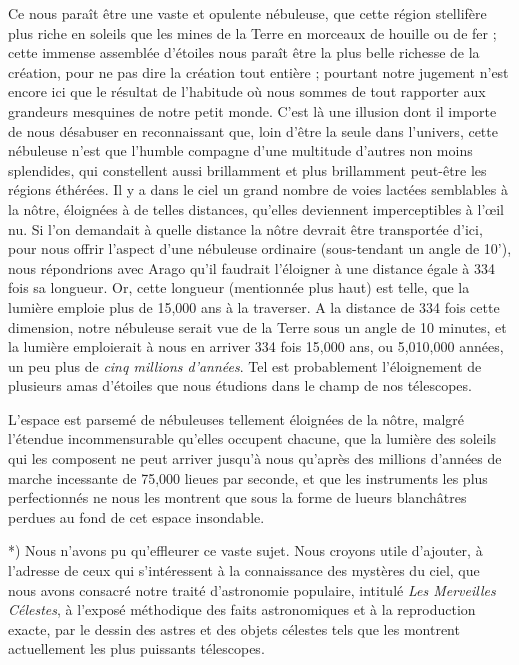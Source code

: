 \documentclass[a4paper, 11pt, oneside]{article}
\begin{document}
Ce nous paraît être une vaste et opulente nébuleuse, que cette région stellifère plus riche en soleils que les mines de la Terre en morceaux de houille ou de fer ; cette immense assemblée d'étoiles nous paraît être la plus belle richesse de la création, pour ne pas dire la création tout entière ; pourtant notre jugement n'est encore ici que le résultat de l'habitude où nous sommes de tout rapporter aux grandeurs mesquines de notre petit monde. C'est là une illusion dont il importe de nous désabuser en reconnaissant que, loin d'être la seule dans l'univers, cette nébuleuse n'est que l'humble compagne d'une multitude d'autres non moins splendides, qui constellent aussi brillamment et plus brillamment peut-être les régions éthérées. Il y a dans le ciel un grand nombre de voies lactées semblables à la nôtre, éloignées à de telles distances, qu'elles deviennent imperceptibles à l'œil nu. Si l'on demandait à quelle distance la nôtre devrait être transportée d'ici, pour nous offrir l'aspect d'une nébuleuse ordinaire (sous-tendant un angle de 10'), nous répondrions avec Arago qu'il faudrait l'éloigner à une distance égale à 334 fois sa longueur. Or, cette longueur (mentionnée plus haut) est telle, que la lumière emploie plus de 15,000 ans à la traverser. A la distance de 334 fois cette dimension, notre nébuleuse serait vue de la Terre sous un angle de 10 minutes, et la lumière emploierait à nous en arriver 334 fois 15,000 ans, ou 5,010,000 années, un peu plus de \emph{cinq millions d'années}. Tel est probablement l'éloignement de plusieurs amas d'étoiles que nous étudions dans le champ de nos télescopes.

L'espace est parsemé de nébuleuses tellement éloignées de la nôtre, malgré l'étendue incommensurable qu'elles occupent chacune, que la lumière des soleils qui les composent ne peut arriver jusqu'à nous qu'après des millions d'années de marche incessante de 75,000 lieues par seconde, et que les instruments les plus perfectionnés ne nous les montrent que sous la forme de lueurs blanchâtres perdues au fond de cet espace insondable.

*) Nous n'avons pu qu'effleurer ce vaste sujet. Nous croyons utile d'ajouter, à l'adresse de ceux qui s'intéressent à la connaissance des mystères du ciel, que nous avons consacré notre traité d'astronomie populaire, intitulé \emph{Les Merveilles Célestes}, à l'exposé méthodique des faits astronomiques et à la reproduction exacte, par le dessin des astres et des objets célestes tels que les montrent actuellement les plus puissants télescopes.
\end{document}

